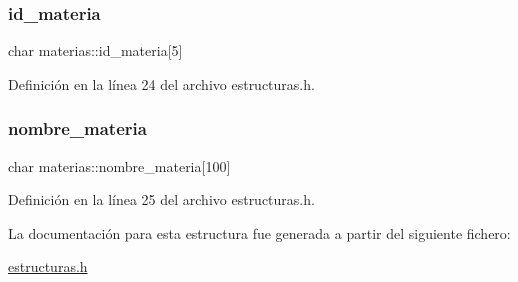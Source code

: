 \subsubsection{\texorpdfstring{id\+\_\+materia}{id\_materia}}
{\footnotesize\ttfamily char materias\+::id\+\_\+materia\mbox{[}5\mbox{]}}



Definición en la línea 24 del archivo estructuras.\+h.

\mbox{\label{structmaterias_a5d39a4c56dcd41b1cdc9873c5873400e}} 
\subsubsection{\texorpdfstring{nombre\+\_\+materia}{nombre\_materia}}
{\footnotesize\ttfamily char materias\+::nombre\+\_\+materia\mbox{[}100\mbox{]}}



Definición en la línea 25 del archivo estructuras.\+h.



La documentación para esta estructura fue generada a partir del siguiente fichero\+:\begin{DoxyCompactItemize}
\item 
\mbox{\hyperlink{estructuras_8h}{estructuras.\+h}}\end{DoxyCompactItemize}
